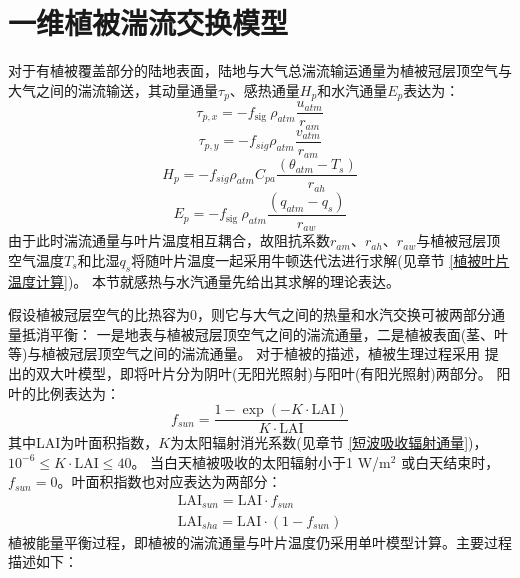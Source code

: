 \section{一维植被湍流交换模型}\label{一维植被湍流交换模型}
对于有植被覆盖部分的陆地表面，陆地与大气总湍流输运通量为植被冠层顶空气与大气之间的湍流输送，其动量通量$\tau_p$、感热通量$H_p$和水汽通量$E_p$表达为：
\begin{equation}
\tau_{p, x}=-f_{\text {sig }} \rho_{atm} \frac{u_{atm}}{r_{a m}}
\end{equation}
\begin{equation}
\tau_{p, y}=-f_{sig} \rho_{atm} \frac{v_{atm}}{r_{a m}}
\end{equation}
\begin{equation}
H_{p}=-f_{sig} \rho_{atm} C_{p a} \frac{\left(\theta_{atm}-T_{s}\right)}{r_{a h}}
\end{equation}
\begin{equation}
E_{p}=-f_{\text {sig }} \rho_{atm} \frac{\left(q_{atm}-q_{s}\right)}{r_{a w}}
\end{equation}
由于此时湍流通量与叶片温度相互耦合，故阻抗系数$r_{am}$、$r_{ah}$、$r_{aw}$与植被冠层顶空气温度$T_s$和比湿$q_s$将随叶片温度一起采用牛顿迭代法进行求解(见章节 \ref{植被叶片温度计算})。
本节就感热与水汽通量先给出其求解的理论表达。


假设植被冠层空气的比热容为0，则它与大气之间的热量和水汽交换可被两部分通量抵消平衡：
一是地表与植被冠层顶空气之间的湍流通量，二是植被表面(茎、叶等)与植被冠层顶空气之间的湍流通量。
对于植被的描述，植被生理过程采用 \citet{dai2004two}提出的双大叶模型，即将叶片分为阴叶(无阳光照射)与阳叶(有阳光照射)两部分。
阳叶的比例表达为：
\begin{equation}
f_{sun}=\frac{1-\exp (-K \cdot \text {LAI})}{K \cdot \text {LAI}}
\end{equation}
其中LAI为叶面积指数，$K$为太阳辐射消光系数(见章节 \ref{短波吸收辐射通量})，${10}^{-6}\le K \cdot \text {LAI}\le40$。
当白天植被吸收的太阳辐射小于1 W/m$^2$ 或白天结束时，$f_{sun}=0$。叶面积指数也对应表达为两部分：
\begin{equation}
\begin{array}{c} \text {LAI}_{sun}= \text {LAI} \cdot f_{sun} \\ \text {LAI}_{sha}=\text {LAI} \cdot \left(1-f_{sun}\right)\end{array}
\end{equation}
植被能量平衡过程，即植被的湍流通量与叶片温度仍采用单叶模型计算。主要过程描述如下：


